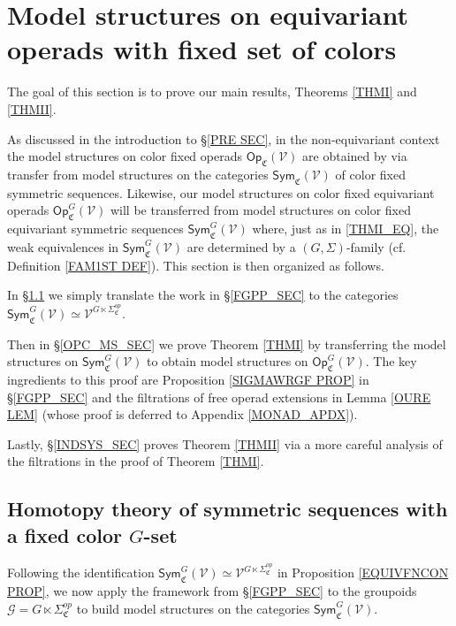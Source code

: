 \documentclass[a4paper,10pt
]{article}%
\numberwithin{equation}{section}
\numberwithin{figure}{section}
\theoremstyle{definition} %
\newcommand{\V}{\ensuremath{\mathcal V}}
\newcommand{\G}{\ensuremath{\mathcal G}}
\newcommand{\1}{\ensuremath{\mathbbm 1}}%
\begin{document}
\section{Model structures on equivariant operads with fixed set of colors}\label{FIXCOL SEC}


The goal of this section is to prove our main results,
Theorems \ref{THMI} and \ref{THMII}.


As discussed in the introduction to \S \ref{PRE SEC},
in the non-equivariant context the model structures on 
color fixed operads $\mathsf{Op}_{\mathfrak{C}}(\V)$
are obtained by via transfer from model structures on the categories
$\mathsf{Sym}_{\mathfrak{C}}(\V)$
of color fixed symmetric sequences.
Likewise, our model structures 
on color fixed equivariant operads 
$\mathsf{Op}^G_{\mathfrak{C}}(\V)$
will be transferred from model structures on 
color fixed equivariant symmetric sequences
$\mathsf{Sym}^G_{\mathfrak{C}}(\V)$
where, just as in \eqref{THMI_EQ},
the weak equivalences in 
$\mathsf{Sym}^G_{\mathfrak{C}}(\V)$
are determined by a $(G,\Sigma)$-family
(cf. Definition \ref{FAM1ST DEF}).
This section is then organized as follows.

In \S \ref{SYMC_MS_SEC} we simply translate
the work in \S \ref{FGPP_SEC} to the categories 
$\mathsf{Sym}^{G}_{\mathfrak{C}}(\V)
\simeq \V^{G \ltimes \Sigma^{op}_{\mathfrak{C}}}$.

Then in \S \ref{OPC_MS_SEC}
we prove Theorem \ref{THMI} by transferring the model structures on 
$\mathsf{Sym}^{G}_{\mathfrak{C}}(\V)$ to obtain model structures on
$\mathsf{Op}^{G}_{\mathfrak{C}}(\V)$.
The key ingredients to this proof are
Proposition \ref{SIGMAWRGF PROP} in \S \ref{FGPP_SEC} and
the filtrations of free operad extensions 
in Lemma \ref{OURE LEM}
(whose proof is deferred to Appendix \ref{MONAD_APDX}).

Lastly, \S \ref{INDSYS_SEC} proves 
Theorem \ref{THMII} via a more careful analysis
of the filtrations in the proof of Theorem \ref{THMI}.








\subsection{Homotopy theory of symmetric sequences with a fixed color $G$-set}
\label{SYMC_MS_SEC}


Following the identification 
$\mathsf{Sym}^G_{\mathfrak{C}}(\V)
\simeq \V^{G \ltimes \Sigma^{op}_{\mathfrak{C}}}$
in Proposition \ref{EQUIVFNCON PROP},
we now apply the framework from \S \ref{FGPP_SEC}  
to the groupoids
$\G = G \ltimes \Sigma_{\mathfrak C}^{op}$
to build model structures on the categories 
$\mathsf{Sym}^G_{\mathfrak{C}}(\V)$.
%
\end{document}
